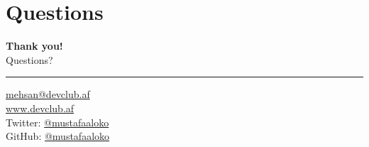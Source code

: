 \documentclass{beamer}
\newcommand{\wl}[2]{\href{#1}{\textcolor{UniBlue}{#2}}}
\begin{document}
\section*{Questions}
\begin{frame}{}
\centering
\textcolor{UniBlue}{\Large \textbf{Thank you!}} \\
Questions?

{\color{UniBlue} \rule{\linewidth}{0.2mm} }
\wl{mailto:mehsan@devclub.af}{mehsan@devclub.af}\\
\wl{www.devclub.af}{www.devclub.af}\\
Twitter: \wl{https://twitter.com/mustafaaloko}{@mustafaaloko}\\
GitHub: \wl{https://github.com/mustafaaloko}{@mustafaaloko}\\
\end{frame}
\end{document}

